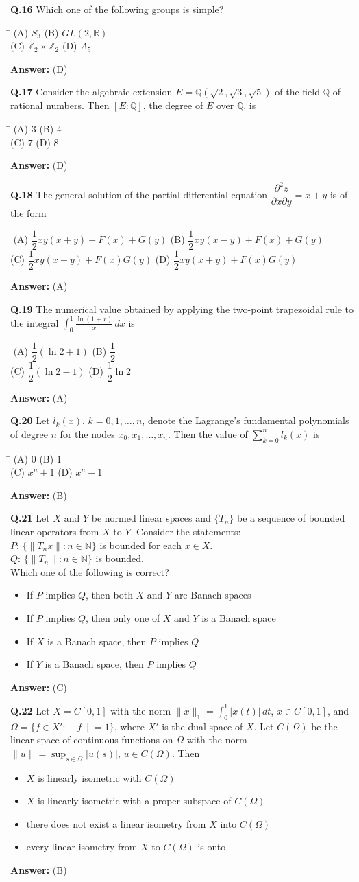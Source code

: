 \documentclass[11pt,a4paper]{article}
\newcommand{\optsfourA}[4]{%
  \begin{tabbing}
    \hspace{0.48\linewidth}\=\kill
    (A) #1 \> (B) #2 \\[2pt]
    (C) #3 \> (D) #4
  \end{tabbing}%
}
\newcommand{\optslistA}[4]{%
  \begin{itemize}
    \setlength{\itemsep}{2pt}\setlength{\parskip}{0pt}
    \item[(A)] #1
    \item[(B)] #2
    \item[(C)] #3
    \item[(D)] #4
  \end{itemize}%
}
\newcommand{\ans}[1]{\textbf{Answer:} #1\par\medskip}
\begin{document}
\textbf{Q.16} Which one of the following groups is simple?
\optsfourA{$S_3$}{$GL(2, \mathbb{R})$}{$\mathbb{Z}_2 \times \mathbb{Z}_2$}{$A_5$}
\ans{(D)}

\textbf{Q.17} Consider the algebraic extension $E = \mathbb{Q}(\sqrt{2}, \sqrt{3}, \sqrt{5})$ of the field $\mathbb{Q}$ of rational numbers. Then $[E : \mathbb{Q}]$, the degree of $E$ over $\mathbb{Q}$, is
\optsfourA{$3$}{$4$}{$7$}{$8$}
\ans{(D)}

\textbf{Q.18} The general solution of the partial differential equation $\dfrac{\partial^2 z}{\partial x \partial y} = x + y$ is of the form
\optsfourA{$\dfrac{1}{2}xy(x + y) + F(x) + G(y)$}{$\dfrac{1}{2}xy(x - y) + F(x) + G(y)$}{$\dfrac{1}{2}xy(x - y) + F(x)G(y)$}{$\dfrac{1}{2}xy(x + y) + F(x)G(y)$}
\ans{(A)}

\textbf{Q.19} The numerical value obtained by applying the two-point trapezoidal rule to the integral $\displaystyle\int_0^1 \frac{\ln(1 + x)}{x}\,dx$ is
\optsfourA{$\dfrac{1}{2}(\ln 2 + 1)$}{$\dfrac{1}{2}$}{$\dfrac{1}{2}(\ln 2 - 1)$}{$\dfrac{1}{2}\ln 2$}
\ans{(A)}

\textbf{Q.20} Let $l_k(x)$, $k = 0, 1, \dots, n$, denote the Lagrange's fundamental polynomials of degree $n$ for the nodes $x_0, x_1, \dots, x_n$. Then the value of $\displaystyle\sum_{k=0}^{n} l_k(x)$ is
\optsfourA{$0$}{$1$}{$x^n + 1$}{$x^n - 1$}
\ans{(B)}

\textbf{Q.21} Let $X$ and $Y$ be normed linear spaces and $\{T_n\}$ be a sequence of bounded linear operators from $X$ to $Y$. Consider the statements:\\
$P$: $\{\|T_n x\| : n \in \mathbb{N}\}$ is bounded for each $x \in X$.\\
$Q$: $\{\|T_n\| : n \in \mathbb{N}\}$ is bounded.\\
Which one of the following is correct?
\optslistA{If $P$ implies $Q$, then both $X$ and $Y$ are Banach spaces}{If $P$ implies $Q$, then only one of $X$ and $Y$ is a Banach space}{If $X$ is a Banach space, then $P$ implies $Q$}{If $Y$ is a Banach space, then $P$ implies $Q$}
\ans{(C)}

\textbf{Q.22} Let $X = C[0, 1]$ with the norm $\|x\|_1 = \displaystyle\int_0^1 |x(t)|\,dt$, $x \in C[0, 1]$, and $\Omega = \{f \in X' : \|f\| = 1\}$, where $X'$ is the dual space of $X$. Let $C(\Omega)$ be the linear space of continuous functions on $\Omega$ with the norm $\|u\| = \sup_{s \in \Omega} |u(s)|$, $u \in C(\Omega)$. Then
\optslistA{$X$ is linearly isometric with $C(\Omega)$}{$X$ is linearly isometric with a proper subspace of $C(\Omega)$}{there does not exist a linear isometry from $X$ into $C(\Omega)$}{every linear isometry from $X$ to $C(\Omega)$ is onto}
\ans{(B)}
\end{document}
